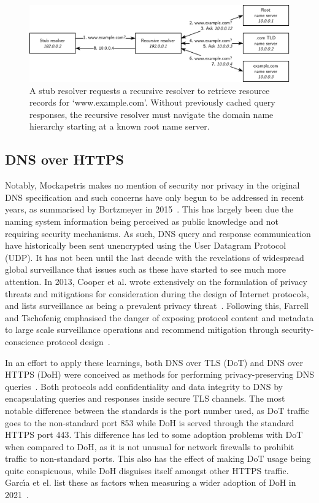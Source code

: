 \begin{figure}[ht]
\centerline{\includegraphics[width=160mm]{images/dns-resolve.png}}
\caption[Example DNS name resolution process]{A stub resolver requests a recursive resolver to retrieve resource records for `www.example.com'. Without previously cached query responses, the recursive resolver must navigate the domain name hierarchy starting at a known root name server.}
\label{dns_resolve_figure}
\end{figure}

\subsection{DNS over HTTPS}

Notably, Mockapetris makes no mention of security nor privacy in the original DNS specification and such concerns have only begun to be addressed in recent years, as summarised by Bortzmeyer in 2015~\cite{rfc7626}. This has largely been due the naming system information being perceived as public knowledge and not requiring security mechanisms. As such, DNS query and response communication have historically been sent unencrypted using the User Datagram Protocol (UDP). It has not been until the last decade with the revelations of widespread global surveillance that issues such as these have started to see much more attention. In 2013, Cooper et al. wrote extensively on the formulation of privacy threats and mitigations for consideration during the design of Internet protocols, and lists surveillance as being a prevalent privacy threat~\cite{rfc6973}. Following this, Farrell and Tschofenig emphasised the danger of exposing protocol content and metadata to large scale surveillance operations and recommend mitigation through security-conscience protocol design~\cite{rfc7258}.

In an effort to apply these learnings, both DNS over TLS (DoT) and DNS over HTTPS (DoH) were conceived as methods for performing privacy-preserving DNS queries~\cite{rfc7858, rfc8484}. Both protocols add confidentiality and data integrity to DNS by encapsulating queries and responses inside secure TLS channels. The most notable difference between the standards is the port number used, as DoT traffic goes to the non-standard port 853 while DoH is served through the standard HTTPS port 443. This difference has led to some adoption problems with DoT when compared to DoH, as it is not unusual for network firewalls to prohibit traffic to non-standard ports. This also has the effect of making DoT usage being quite conspicuous, while DoH disguises itself amongst other HTTPS traffic. Garc{\'\i}a et el. list these as factors when measuring a wider adoption of DoH in 2021~\cite{garcia2021large}.

